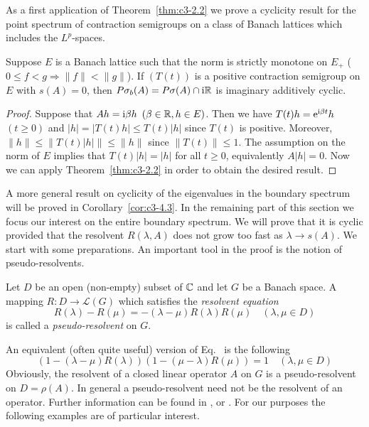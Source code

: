 As a first application of Theorem~\ref{thm:c3-2.2} we prove a cyclicity result for the point spectrum of contraction semigroups on a class of Banach lattices which includes the $L^p$-spaces.

\begin{corollary}\label{cor:c3-2.3}
	Suppose $E$ is a Banach lattice such that the norm is strictly monotone on $E_{+}$ (\ie  $0 \leq f < g \Rightarrow \|f\| < \|g\|$).
	If\/ $(T(t))$ is a positive contraction semigroup on $E$ with $s(A) = 0$, then $P\sigma_{b}(A) = P\sigma(A) \cap \mathrm{i}\mathbb{R} $ is imaginary additively cyclic.
\end{corollary}
\begin{proof}
	Suppose that $Ah = \mathrm{i}\beta  h$ $(\beta \in \mathbb{R} , h \in E)$.
	Then we have $T(t)h = \mathrm{e}^{\mathrm{i}\beta  t}h$ $(t \geq 0)$ and $|h| = |T(t)h| \leq T(t)|h|$ since $T(t)$ is positive.
	Moreover, $\|h\| \leq \|T(t)|h|\| \leq \|h\|$ since $\|T(t)\| \leq 1$.
	The assumption on the norm of\/ $E$ implies that $T(t)|h| = |h|$ for all $t \geq 0$, equivalently $A|h| = 0$.
	Now we can apply Theorem~\ref{thm:c3-2.2} in order to obtain the desired result.
\end{proof}
A more general result on cyclicity of the eigenvalues in the boundary spectrum%
will be proved in Corollary~\ref{cor:c3-4.3}.
In the remaining part of this section we focus our interest on the entire boundary spectrum.
We will prove that it is cyclic 
provided that the resolvent $R(\lambda,A)$ does not grow too fast as $\lambda \to s(A)$.
We start with some preparations.
An important tool in the proof is the notion of pseudo-resolvents.
\begin{definition}\label{def:c3-2.4}
	Let $D$ be an open (non-empty) subset of\/ $\mathbb{C} $ and let $G$ be a Banach space.
	A mapping $R \colon D \to \mathcal{L}(G)$ which satisfies the \emph{resolvent equation}
	\begin{equation}\label{eq:c3-2.8}
		R(\lambda) - R(\mu) = -(\lambda - \mu)R(\lambda)R(\mu) \quad (\lambda,\mu \in D)
	\end{equation}
	is called a \emph{pseudo-resolvent} on $G$.
\end{definition}
An equivalent (often quite useful) version of Eq.~ is the following
\begin{equation}\label{eq:c3-2.9}
	(1 - (\lambda - \mu)R(\lambda))(1 - (\mu - \lambda)R(\mu)) = 1 \quad (\lambda,\mu \in D)
\end{equation}
Obviously, the resolvent of a closed linear operator $A$ on $G$ is a pseudo-resolvent on $D = \rho(A)$.
In general a pseudo-resolvent need not be the resolvent of an operator.
Further information can be found in \textcite{hillephillips:1957}, \textcite{pazy:1983} or \textcite{yosida:1965}.
For our purposes the following examples are of particular interest.

